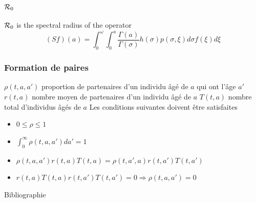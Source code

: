\documentclass[aspectratio=169]{beamer}\usepackage[]{graphicx}\usepackage[]{xcolor}
\begin{document}
\begin{frame}\frametitle{$\mathcal{R}_0$}
$\mathcal{R}_0$ is the spectral radius of the operator
\[
(Sf)(a)=\int_0^\omega\int_0^a \frac{\Gamma(a)}{\Gamma(\sigma)}
h(\sigma)p(\sigma,\xi)d\sigma f(\xi)d\xi
\]
\end{frame}


\begin{frame}\frametitle{Formation de paires}
$\rho(t,a,a')$ proportion de partenaires d'un individu âgé de $a$ qui ont l'âge $a'$
\vfill
$r(t,a)$ nombre moyen de partenaires d'un individu âgé de $a$
\vfill
$T(t,a)$ nombre total d'individus âgés de $a$
\vfill
Les conditions suivantes doivent être satisfaites
\begin{itemize}
\item $0\leq\rho\leq 1$
\item $\int_0^\infty \rho(t,a,a')da'=1$
\item $\rho(t,a,a')r(t,a)T(t,a)=\rho(t,a',a)r(t,a')T(t,a')$
\item $r(t,a)T(t,a)r(t,a')T(t,a')=0\Rightarrow \rho(t,a,a')=0$
\end{itemize}
\end{frame}



\begin{frame}[allowframebreaks]{Bibliographie}


\end{frame}
\end{document}

